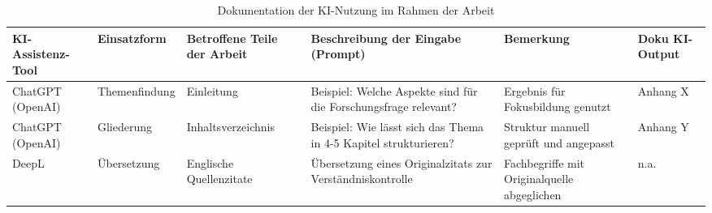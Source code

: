 \begin{table}[H]
  \centering
  \footnotesize
  \begin{tabularx}{\textwidth}{p{2cm} p{1.8cm} p{2.6cm} p{3.1cm} p{2.3cm} p{1.7cm}}
    \toprule
    \textbf{KI-Assistenz-Tool} &
    \textbf{Einsatzform} &
    \textbf{Betroffene Teile der Arbeit} &
    \textbf{Beschreibung der Eingabe (Prompt)} &
    \textbf{Bemerkung} &
    \textbf{Doku KI-Output} \\
    \midrule
    ChatGPT (OpenAI)
      & Themenfindung
      & Einleitung
      & Beispiel: Welche Aspekte sind für die Forschungsfrage relevant?
      & Ergebnis für Fokusbildung genutzt
      & Anhang X \\
    \addlinespace
    ChatGPT (OpenAI)
      & Gliederung
      & Inhaltsverzeichnis
      & Beispiel: Wie lässt sich das Thema in 4-5 Kapitel strukturieren?
      & Struktur manuell geprüft und angepasst
      & Anhang Y \\
    \addlinespace
    DeepL
      & Übersetzung
      & Englische Quellenzitate
      & Übersetzung eines Originalzitats zur Verständniskontrolle
      & Fachbegriffe mit Originalquelle abgeglichen
      & n.a. \\
    \bottomrule
  \end{tabularx}
  \caption{Dokumentation der KI-Nutzung im Rahmen der Arbeit}
  \label{tab:ki-nutzung}
\end{table}
